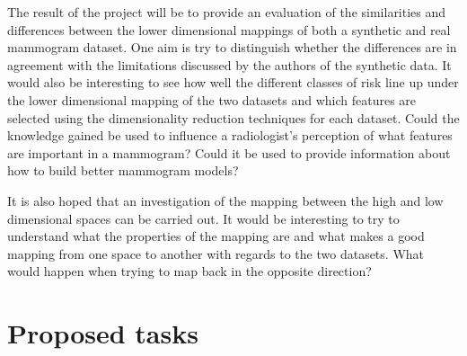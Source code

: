 \documentclass[11pt,fleqn,twoside]{article}
\begin{document}
The result of the project will be to provide an evaluation of the similarities and differences between the lower dimensional mappings of both a synthetic and real mammogram dataset. One aim is try to distinguish whether the differences are in agreement with the limitations discussed by the authors of the synthetic data. It would also be interesting to see how well the different classes of risk line up under the lower dimensional mapping of the two datasets and which features are selected using the dimensionality reduction techniques for each dataset. Could the knowledge gained be used to influence a radiologist's perception of what features are important in a mammogram? Could it be used to provide information about how to build better mammogram models?

It is also hoped that an investigation of the mapping between the high and low dimensional spaces can be carried out. It would be interesting to try to understand what the properties of the mapping are and what makes a good mapping from one space to another with regards to the two datasets. What would happen when trying to map back in the opposite direction?

\section{Proposed tasks}
\end{document}
